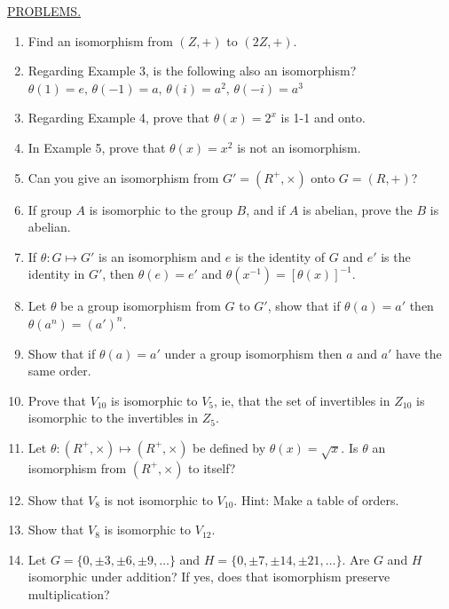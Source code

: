 \documentclass[12pt]{article}
\theoremstyle{definition}
\begin{document}
\underline{PROBLEMS.}
\begin{enumerate}
\item Find an isomorphism from $(Z,+)$ to $(2Z,+)$.
\item Regarding Example 3, is the following also an isomorphism? $\theta(1)=e,\, \theta(-1)=a,\, \theta(i)=a^2,\, \theta(-i)=a^3$
\item Regarding Example 4, prove that $\theta(x)=2^x$ is 1-1 and onto.
\item In Example 5, prove that $\theta(x)=x^2$ is not an isomorphism.
\item Can you give an isomorphism from $G'=(R^+,\times)$ onto $G=(R,+)$?
\item If group $A$ is isomorphic to the group $B$, and if $A$ is abelian, prove the $B$ is abelian.
\item If $\theta:G\mapsto G'$ is an isomorphism and $e$ is the identity of $G$ and $e'$ is the identity in $G'$, then $\theta(e)=e'$ and $\theta(x^{-1})=[\theta(x)]^{-1}$.
\item Let $\theta$ be a group isomorphism from $G$ to $G'$, show that if $\theta(a)=a'$ then $\theta(a^n)=(a')^n$.
\item Show that if $\theta(a)=a'$ under a group isomorphism then $a$ and $a'$ have the same order.
\item Prove that $V_{10}$ is isomorphic to $V_5$, ie, that the set of invertibles in $Z_{10}$ is isomorphic to the invertibles in $Z_5$.
\item Let $\theta:(R^+,\times)\mapsto(R^+,\times)$ be defined by $\theta(x)=\sqrt x$.  Is $\theta$ an isomorphism from $(R^+,\times)$ to itself?
\item Show that $V_8$ is not isomorphic to $V_{10}$.  Hint: Make a table of orders.
\item Show that $V_8$ is isomorphic to $V_{12}$.
\item Let $G=\{0,\pm3,\pm6, \pm9,\dots\}$ and $H=\{0,\pm7,\pm14,\pm21,\dots\}$.  Are $G$ and $H$ isomorphic under addition?  If yes, does that isomorphism preserve multiplication?
\end{enumerate}
\end{document}
